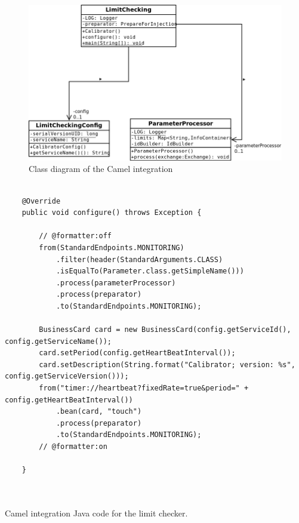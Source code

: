 \begin{figure}[H]
\centerline{\includegraphics[width=1\textwidth]{images/LimitCheckingCamelClassDiagram.png}}
\caption{Class diagram of the Camel integration}
\label{f5.7}
\end{figure}
\pagebreak
\begin{table}[H]
\lstset{language=Java}
\begin{lstlisting}

    @Override
    public void configure() throws Exception {

        // @formatter:off
        from(StandardEndpoints.MONITORING)
            .filter(header(StandardArguments.CLASS)
            .isEqualTo(Parameter.class.getSimpleName()))
            .process(parameterProcessor)
            .process(preparator)
            .to(StandardEndpoints.MONITORING);
        
        BusinessCard card = new BusinessCard(config.getServiceId(), config.getServiceName());
        card.setPeriod(config.getHeartBeatInterval());
        card.setDescription(String.format("Calibrator; version: %s", config.getServiceVersion()));
        from("timer://heartbeat?fixedRate=true&period=" + config.getHeartBeatInterval())
            .bean(card, "touch")
            .process(preparator)
            .to(StandardEndpoints.MONITORING);
        // @formatter:on

    }



\end{lstlisting}
\caption{Camel integration Java code for the limit checker.}
\label{Table5.5}
\end{table}

\pagebreak

